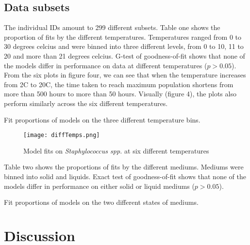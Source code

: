 \documentclass[11pt, a4paper, titlepage]{article}
\begin{document}
\subsection{Data subsets}
The individual IDs amount to 299 different subsets. Table one shows the proportion of fits by the different temperatures. Temperatures ranged from 0 to 30 degrees celcius and were binned into three different levels, from 0 to 10, 11 to 20 and more than 21 degrees celcius. G-test of goodness-of-fit shows that none of the models differ in performance on data at different temperatures ($p > 0.05$). From the six plots in figure four, we can see that when the temperature increases from 2\textdegree{}C to 20\textdegree{}C, the time taken to reach maximum population shortens from more than 500 hours to more than 50 hours. Visually (figure 4), the plots also perform similarly across the six different temperatures.

\begin{table}[ht!]
    \centering{}
    \caption{Fit proportions of models on the three different temperature bins.}
\end{table}

\begin{figure}[ht!]
    \centering\texttt{[image: diffTemps.png]}
    \caption{Model fits on \emph{Staphylococcus spp.} at six different temperatures}
\end{figure}

Table two shows the proportions of fits by the different mediums. Mediums were binned into solid and liquids. Exact test of goodness-of-fit shows that none of the models differ in performance on either solid or liquid mediums ($p > 0.05$).

\begin{table}[ht!]
    \centering{}
    \caption{Fit proportions of models on the two different states of mediums.}
\end{table}

\section{Discussion}
\end{document}
